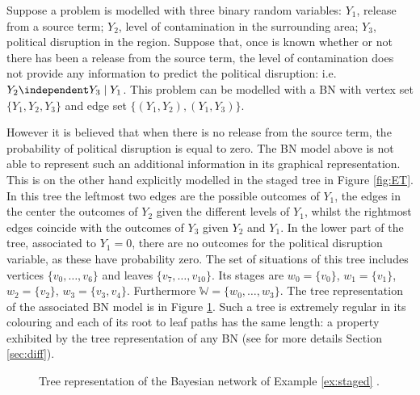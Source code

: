 \begin{example}
\label{ex:staged}
Suppose a problem is modelled with three binary random variables: $Y_1$, release from a source term; $Y_2$, level of contamination in the surrounding area; $Y_3$, political disruption in the region. Suppose that, once is known whether or not there has been a release from the source term,  the level of contamination does not provide any information to predict the political disruption: i.e. $Y_2\independent Y_3\;|\; Y_1$. This problem can be modelled with a \gls{BN} with vertex set $\{Y_1,Y_2,Y_3\}$ and edge set $\{(Y_1,Y_2), (Y_1,Y_3)\}$. 

However it is believed that when there is no release from the source term, the probability of political disruption is equal to zero. The \gls{BN} model above is not able to represent such an additional information in its graphical representation. This is on the other hand explicitly modelled in the staged tree in Figure \ref{fig:ET}. In this tree the leftmost two edges are the possible outcomes of $Y_1$, the edges in the center the outcomes of $Y_2$ given the different levels of $Y_1$, whilst the rightmost edges coincide with the outcomes of $Y_3$ given $Y_2$ and $Y_1$. In the lower part of the tree, associated to $Y_1=0$, there are no outcomes for the political disruption variable, as these have probability zero. The set of situations of this tree includes vertices $\{v_0,\dots, v_6\}$ and leaves $\{v_{7},\dots, v_{10}\}$. Its stages are $w_0=\{v_0\}$, $w_1=\{v_1\}$, $w_2=\{v_2\}$, $w_3=\{v_3,v_4\}$. Furthermore $\mathbb{W}=\{w_0,\dots,w_3\}$. The tree representation of the associated \gls{BN} model is in Figure \ref{fig:ETBN}. Such a tree is extremely regular in its colouring and each of its root to leaf paths has the same length: a property exhibited by the tree representation of any \gls{BN} (see for more details Section \ref{sec:diff}).
\end{example}

\begin{figure}
\centerline{
\hspace*{-16mm} }
\caption{Tree representation of the Bayesian network of Example \ref{ex:staged} .\label{fig:ETBN}}
\end{figure}

